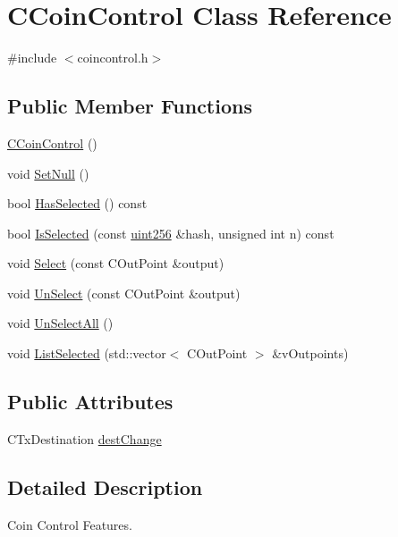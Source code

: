 \hypertarget{class_c_coin_control}{}\section{C\+Coin\+Control Class Reference}
\label{class_c_coin_control}


{\ttfamily \#include $<$coincontrol.\+h$>$}

\subsection*{Public Member Functions}
\begin{DoxyCompactItemize}
\item 
\hyperlink{class_c_coin_control_a76b6d0cfff21c4d74a4c4aebfc7f697d}{C\+Coin\+Control} ()
\item 
void \hyperlink{class_c_coin_control_aadca0a9e82e1e6d84dff4649e1d29d31}{Set\+Null} ()
\item 
bool \hyperlink{class_c_coin_control_a8c8b06e183e7a30c646bdec793b30e89}{Has\+Selected} () const 
\item 
bool \hyperlink{class_c_coin_control_a8cbb071e0eb4ff34ba0209b3708c8142}{Is\+Selected} (const \hyperlink{classuint256}{uint256} \&hash, unsigned int n) const 
\item 
void \hyperlink{class_c_coin_control_a7903e85623ba9b21583bd4018d17546c}{Select} (const C\+Out\+Point \&output)
\item 
void \hyperlink{class_c_coin_control_a7f9b8135840df5907bc49a4c5cb19ba4}{Un\+Select} (const C\+Out\+Point \&output)
\item 
void \hyperlink{class_c_coin_control_a78bc21b1698e6ae5e6c2fef9758db39c}{Un\+Select\+All} ()
\item 
void \hyperlink{class_c_coin_control_a176b3a32b5f623fe25b8e61ca561422e}{List\+Selected} (std\+::vector$<$ C\+Out\+Point $>$ \&v\+Outpoints)
\end{DoxyCompactItemize}
\subsection*{Public Attributes}
\begin{DoxyCompactItemize}
\item 
C\+Tx\+Destination \hyperlink{class_c_coin_control_aa991ffd830267f6c2103fa7e03213f41}{dest\+Change}
\end{DoxyCompactItemize}


\subsection{Detailed Description}
Coin Control Features. 

